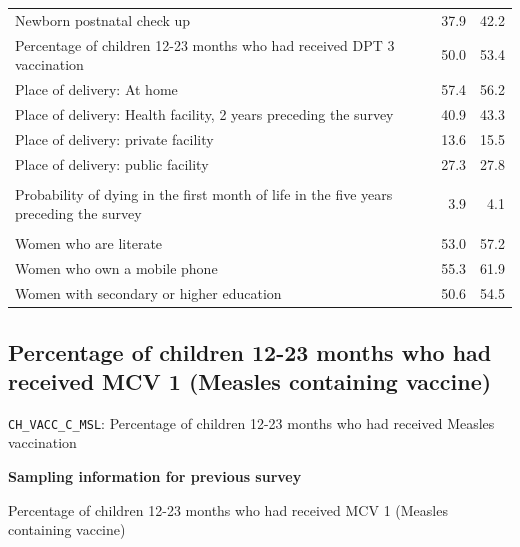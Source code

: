 \documentclass[
]{article}
\begin{document}
\begin{table}[!h]
\begin{tabular}[t]{lrr}
\hspace{1em}Newborn postnatal check up & 37.9 & 42.2\\
\hspace{1em}Percentage of children 12-23 months who had received DPT 3 vaccination & 50.0 & 53.4\\
\hspace{1em}Place of delivery: At home & 57.4 & 56.2\\
\hspace{1em}Place of delivery: Health facility, 2 years preceding the survey & 40.9 & 43.3\\
\hspace{1em}Place of delivery: private facility & 13.6 & 15.5\\
\hspace{1em}Place of delivery: public facility & 27.3 & 27.8\\
\addlinespace[0.3em]
\multicolumn{3}{l}{\textbf{Outcomes}}\\
\hspace{1em}Probability of dying in the first month of life in the five years preceding the survey & 3.9 & 4.1\\
\addlinespace[0.3em]
\multicolumn{3}{l}{\textbf{Social determinants}}\\
\hspace{1em}Women who are literate & 53.0 & 57.2\\
\hspace{1em}Women who own a mobile phone & 55.3 & 61.9\\
\hspace{1em}Women with secondary or higher education & 50.6 & 54.5\\
\bottomrule
\end{tabular}
\end{table}

\newpage

\subsection{Percentage of children 12-23 months who had received MCV 1 (Measles containing vaccine)}\label{percentage-of-children-12-23-months-who-had-received-mcv-1-measles-containing-vaccine}

\texttt{CH\_VACC\_C\_MSL}: Percentage of children 12-23 months who had received Measles vaccination

\textbf{Sampling information for previous survey}

Percentage of children 12-23 months who had received MCV 1 (Measles containing vaccine)
\end{document}
